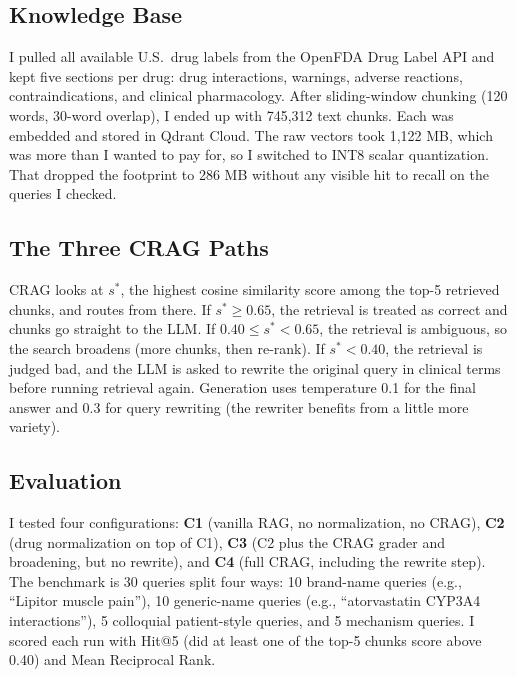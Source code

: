 \documentclass[12pt]{article}
\begin{document}
\subsection{Knowledge Base}

I pulled all available U.S.\ drug labels from the OpenFDA Drug Label API and kept five sections per drug: drug interactions, warnings, adverse reactions, contraindications, and clinical pharmacology. After sliding-window chunking (120 words, 30-word overlap), I ended up with 745{,}312 text chunks. Each was embedded and stored in Qdrant Cloud. The raw vectors took 1{,}122 MB, which was more than I wanted to pay for, so I switched to INT8 scalar quantization. That dropped the footprint to 286 MB without any visible hit to recall on the queries I checked.

\subsection{The Three CRAG Paths}

CRAG looks at $s^*$, the highest cosine similarity score among the top-5 retrieved chunks, and routes from there. If $s^* \geq 0.65$, the retrieval is treated as correct and chunks go straight to the LLM. If $0.40 \leq s^* < 0.65$, the retrieval is ambiguous, so the search broadens (more chunks, then re-rank). If $s^* < 0.40$, the retrieval is judged bad, and the LLM is asked to rewrite the original query in clinical terms before running retrieval again. Generation uses temperature 0.1 for the final answer and 0.3 for query rewriting (the rewriter benefits from a little more variety).

\subsection{Evaluation}

I tested four configurations: \textbf{C1} (vanilla RAG, no normalization, no CRAG), \textbf{C2} (drug normalization on top of C1), \textbf{C3} (C2 plus the CRAG grader and broadening, but no rewrite), and \textbf{C4} (full CRAG, including the rewrite step). The benchmark is 30 queries split four ways: 10 brand-name queries (e.g., ``Lipitor muscle pain''), 10 generic-name queries (e.g., ``atorvastatin CYP3A4 interactions''), 5 colloquial patient-style queries, and 5 mechanism queries. I scored each run with Hit@5 (did at least one of the top-5 chunks score above 0.40) and Mean Reciprocal Rank.

\end{document}
